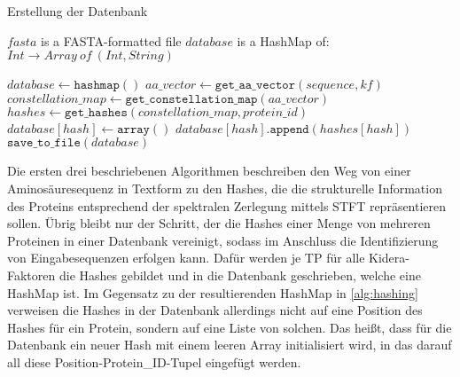         \begin{algorithm}[H]
            \caption{Erstellung der Datenbank}\label{alg:datenbank}
            \begin{algorithmic}[1]
                \Require $fasta$ is a FASTA-formatted file
                \Ensure $database$ is a HashMap of: $Int \rightarrow Array\ of\ (Int, String)$

                \State $database \gets \texttt{hashmap}()$
                        \State $aa\_vector \gets \texttt{get\_aa\_vector}(sequence, kf)$
                        \State $constellation\_map \gets \texttt{get\_constellation\_map}(aa\_vector)$
                        \State $hashes \gets \texttt{get\_hashes}(constellation\_map, protein\_id)$
                                \State $database[hash] \gets \texttt{array}()$
                            \EndIf
                            \State $database[hash].\texttt{append}(hashes[hash])$
                        \EndFor
                    \EndFor
                \EndFor
                \State $\texttt{save\_to\_file}(database)$
            \end{algorithmic}
        \end{algorithm}

        Die ersten drei beschriebenen Algorithmen beschreiben den Weg von einer Aminosäuresequenz in Textform zu den Hashes, die die strukturelle Information des Proteins entsprechend der spektralen Zerlegung mittels \ac{STFT} repräsentieren sollen. Übrig bleibt nur der Schritt, der die Hashes einer Menge von mehreren Proteinen in einer Datenbank vereinigt, sodass im Anschluss die Identifizierung von Eingabesequenzen erfolgen kann. Dafür werden je \ac{TP} für alle Kidera-Faktoren die Hashes gebildet und in die Datenbank geschrieben, welche eine HashMap ist. Im Gegensatz zu der resultierenden HashMap in \autoref{alg:hashing} verweisen die Hashes in der Datenbank allerdings nicht auf eine Position des Hashes für ein Protein, sondern auf eine Liste von solchen. Das heißt, dass für die Datenbank ein neuer Hash mit einem leeren Array initialisiert wird, in das darauf all diese Position-Protein\_ID-Tupel eingefügt werden.

